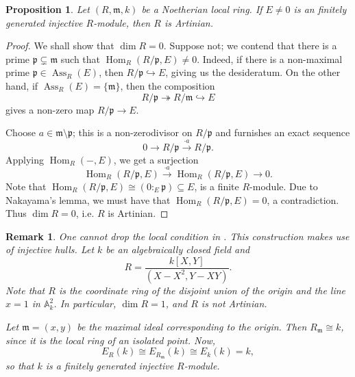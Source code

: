 \documentclass[10pt]{article}
\theoremstyle{thmstyle}
\newtheorem{proposition}[theorem]{Proposition}
\theoremstyle{defstyle}
\newtheorem{remark}[theorem]{Remark}
\newcommand{\bbA}{\mathbb{A}} %
\newcommand{\Hom}{\operatorname{Hom}}
\newcommand{\frakm}{\mathfrak{m}} %
\newcommand{\frakp}{\mathfrak{p}} %
\newcommand{\onto}{\twoheadrightarrow}
\newcommand{\into}{\hookrightarrow}
\newcommand{\Ass}{\operatorname{Ass}}
\begin{document}
\begin{proposition}
    Let $(R,\frakm, k)$ be a Noetherian local ring. If $E\ne 0$ is an finitely generated injective $R$-module, then $R$ is Artinian.
\end{proposition}
\begin{proof}
    We shall show that $\dim R = 0$. Suppose not; we contend that there is a prime $\frakp\subsetneq\frakm$ such that $\Hom_{R}\left(R/\frakp, E\right)\ne 0$. Indeed, if there is a non-maximal prime $\frakp\in\Ass_R(E)$, then $R/\frakp\into E$, giving us the desideratum. On the other hand, if $\Ass_R(E) = \{\frakm\}$, then the composition 
    \begin{equation*}
        R/\frakp\onto R/\frakm\into E
    \end{equation*}
    gives a non-zero map $R/\frakp\to E$.

    Choose $a\in\frakm\setminus\frakp$; this is a non-zerodivisor on $R/\frakp$ and furnishes an exact sequence 
    \begin{equation*}
        0\to R/\frakp\xrightarrow{\cdot a} R/\frakp.
    \end{equation*}
    Applying $\Hom_{R}(-, E)$, we get a surjection 
    \begin{equation*}
        \Hom_{R}(R/\frakp, E)\xrightarrow{\cdot a} \Hom_R(R/\frakp, E)\to 0.
    \end{equation*}
    Note that $\Hom_R(R/\frakp, E)\cong (0:_E\frakp)\subseteq E$, is a finite $R$-module. Due to Nakayama's lemma, we must have that $\Hom_R(R/\frakp, E) = 0$, a contradiction. Thus $\dim R = 0$, i.e. $R$ is Artinian.
\end{proof}

\begin{remark}
    One cannot drop the local condition in . This construction makes use of injective hulls. Let $k$ be an algebraically closed field and 
    \begin{equation*}
        R = \frac{k[X, Y]}{(X - X^2, Y - XY)}.
    \end{equation*}
    Note that $R$ is the coordinate ring of the disjoint union of the origin and the line $x = 1$ in $\bbA_k^2$. In particular, $\dim R = 1$, and $R$ is not Artinian.
    
    Let $\frakm = (x, y)$ be the maximal ideal corresponding to the origin. Then $R_{\frakm}\cong k$, since it is the local ring of an isolated point. Now, 
    \begin{equation*}
        E_R(k)\cong E_{R_\frakm}(k)\cong E_k(k) = k,
    \end{equation*}
    so that $k$ is a finitely generated injective $R$-module.
\end{remark}
\end{document}
